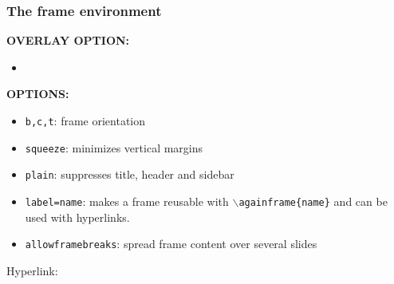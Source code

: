 \begin{frame}[label=frameoptions]
\frametitle{The frame environment}


  \bigskip

  {\bf OVERLAY OPTION:}
  \begin{itemize}
  \item {\tt <+->} 
  \end{itemize}

  \bigskip

  {\bf OPTIONS:}
  \begin{itemize}
  \item {\tt b,c,t}: frame orientation
  \item {\tt squeeze}: minimizes vertical margins
  \item {\tt plain}: suppresses title, header and sidebar
  \item {\tt label=name}: makes a frame reusable with {\tt $\backslash$againframe\{name\}} and can be used with hyperlinks.
  \item {\tt allowframebreaks}: spread frame content over several slides 
  \end{itemize}

  \vfill 

  Hyperlink: \hyperlink{frameoptions}{}

\end{frame}